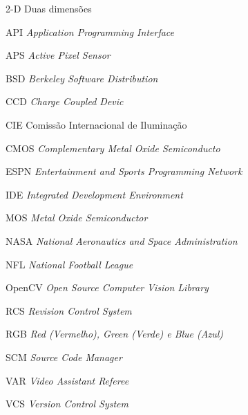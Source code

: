 \begin{siglas}
  \item[2-D] Duas dimensões
  \item[API] \textit{Application Programming Interface}
  \item[APS] \textit{Active Pixel Sensor}
  \item[BSD] \textit{Berkeley Software Distribution}
  \item[CCD] \textit{Charge Coupled Devic}
  \item[CIE] Comissão Internacional de Iluminação
  \item[CMOS] \textit{Complementary Metal Oxide Semiconducto}
  \item[ESPN] \textit{Entertainment and Sports Programming Network}
  \item[IDE] \textit{Integrated Development Environment}
  \item[MOS] \textit{Metal Oxide Semiconductor}
  \item[NASA] \textit{National Aeronautics and Space Administration}
  \item[NFL] \textit{National Football League}
  \item[OpenCV] \textit{Open Source Computer Vision Library}
  \item[RCS] \textit{Revision Control System}
  \item[RGB] \textit{Red (Vermelho), Green (Verde) e Blue (Azul)}
  \item[SCM] \textit{Source Code Manager}
  \item[VAR] \textit{Video Assistant Referee}
  \item[VCS] \textit{Version Control System}
\end{siglas}